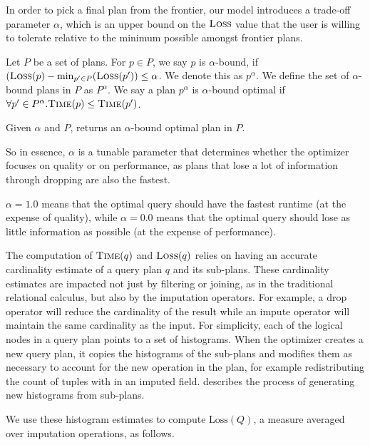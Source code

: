 In order to pick a final plan from the frontier, our model introduces a trade-off parameter $\alpha$, which is an upper bound on the $\textsc{Loss}$ value that the user is willing
to tolerate relative to the minimum possible amongst frontier plans.

\begin{definition}
Let $P$ be a set of plans. For $p \in P$, we say $p$ is $\alpha$-bound, if $(\textsc{Loss}(p) - \min_{p' \in P}(\textsc{Loss}(p')) \leq \alpha$. We denote this as $p^\alpha$.
We define the set of $\alpha$-bound plans in $P$ as $P^\alpha$.
We say a plan $p^\alpha$ is $\alpha$-bound optimal if $\forall p' \in P^\alpha. \textsc{Time}(p) \leq \textsc{Time}(p')$. 
\end{definition}

Given $\alpha$ and $P$, \ProjectName{} returns an $\alpha$-bound optimal plan in $P$.

So in essence, $\alpha$ is a tunable parameter that determines whether the optimizer focuses on quality or on performance, as plans that
lose a lot of information through dropping are also the fastest. 

$\alpha = 1.0$ means that the optimal query should have the fastest runtime (at the expense of quality), while $\alpha=0.0$ means that the optimal query should lose
as little information as possible (at the expense of performance).

The computation of $\textsc{Time}(q)$ and $\textsc{Loss}(q)$ relies on having an accurate cardinality estimate of a query plan $q$ and its sub-plans. 
These cardinality estimates are impacted not just by filtering or joining, as in the traditional relational calculus, but also by the imputation operators.
For example, a drop operator will reduce the cardinality of the result while an impute operator will maintain the same cardinality as the input.
For simplicity, each of the logical nodes in a query plan points to a set of histograms.
When the optimizer creates a new query plan, it copies the histograms of the sub-plans and modifies them as necessary to account for the new operation in the plan, for example
redistributing the count of tuples with \nullv{} in an imputed field.
 describes the process of generating new histograms from sub-plans.

We use these histogram estimates to compute $\text{Loss}(Q)$, a measure averaged over imputation operations, as follows.

